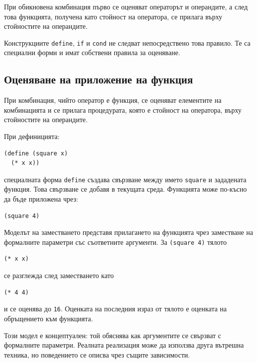 \begin{keydefn}
При обикновена комбинация първо се оценяват операторът и операндите, а след това функцията, получена като стойност на оператора, се прилага върху стойностите на операндите.
\end{keydefn}

Конструкциите \texttt{define}, \texttt{if} и \texttt{cond} не следват непосредствено това правило. Те са специални форми и имат собствени правила за оценяване.

\subsection{Оценяване на приложение на функция}\label{s:19.2.2}

При комбинация, чийто оператор е функция, се оценяват елементите на комбинацията и се прилага процедурата, която е стойност на оператора, върху стойностите на операндите.

При дефиницията:

\begin{verbatim}
(define (square x)
  (* x x))
\end{verbatim}

специалната форма \texttt{define} създава свързване между името \texttt{square} и зададената функция. Това свързване се добавя в текущата среда. Функцията може по-късно да бъде приложена чрез:

\begin{verbatim}
(square 4)
\end{verbatim}

Моделът на заместването представя прилагането на функцията чрез заместване на формалните параметри със съответните аргументи. За \texttt{(square 4)} тялото

\begin{verbatim}
(* x x)
\end{verbatim}

се разглежда след заместването като

\begin{verbatim}
(* 4 4)
\end{verbatim}

и се оценява до \texttt{16}. Оценката на последния израз от тялото е оценката на обръщението към функцията.

Този модел е концептуален: той обяснява как аргументите се свързват с формалните параметри. Реалната реализация може да използва друга вътрешна техника, но поведението се описва чрез същите зависимости.

